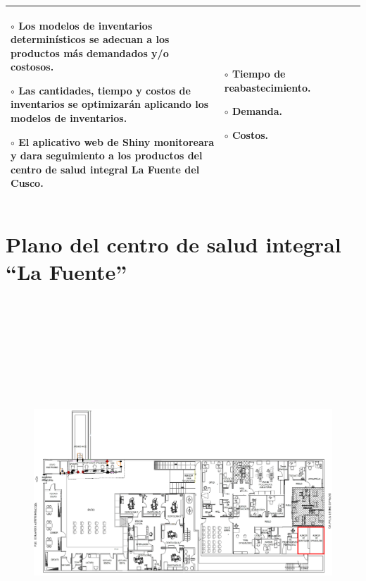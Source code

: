 \begin{landscape}
\begin{table}[h!]
\begin{tabular}{|p{4.5cm}|p{4.5cm}|p{4.5cm}|p{3cm}|p{4.2cm}|}
{    $\circ$ Los modelos de inventarios determinísticos se adecuan a los productos más demandados y/o costosos.\vspace{0.2cm}

    $\circ$ Las cantidades, tiempo y costos de inventarios se optimizarán aplicando los modelos de inventarios.\vspace{0.2cm}

    $\circ$ El aplicativo web de Shiny monitoreara y dara seguimiento a los productos del centro de salud integral La Fuente del Cusco.

    } & \multicolumn{1}{p{3cm}|}{
    \vspace{0.2cm}
    $\circ$ Tiempo de reabastecimiento.\vspace{0.2cm}

    $\circ$ Demanda.\vspace{0.2cm}

    $\circ$ Costos.
    }  & \\ \hline
\end{tabular}
\end{table}

\clearpage
\section{Plano del centro de salud integral ``La Fuente''}
\begin{figure}[H]
  {\includegraphics[width=24cm, height=14.5cm]{images/PLANO1.png}}
\end{figure}


\end{landscape}
